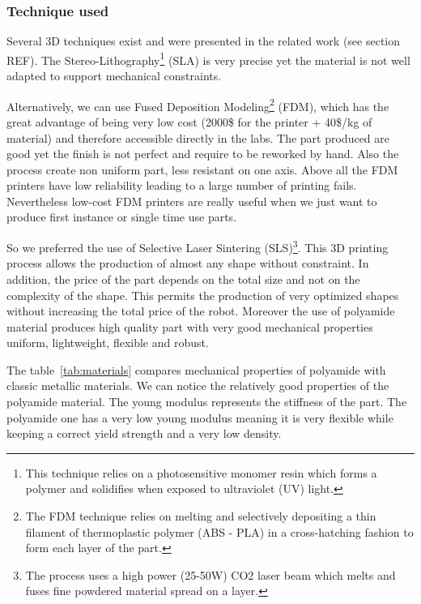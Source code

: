 \subsubsection{Technique used} %

Several 3D techniques exist and were presented in the related work (see section REF). The Stereo-Lithography\footnote{This technique relies on a photosensitive monomer resin which forms a polymer and solidifies when exposed to ultraviolet (UV) light.} (SLA) is very precise yet the material is not well adapted to support mechanical constraints.

Alternatively, we can use Fused Deposition Modeling\footnote{The FDM technique relies on melting and selectively depositing a thin filament of thermoplastic polymer (ABS - PLA) in a cross-hatching fashion to form each layer of the part.} (FDM), which has the great advantage of being very low cost (2000\$ for the printer + 40\$/kg of material) and therefore accessible directly in the labs. The part produced are good yet the finish is not perfect and require to be reworked by hand. Also the process create non uniform part, less resistant on one axis. Above all the FDM printers have low reliability leading to a large number of printing fails. Nevertheless low-cost FDM printers are really useful when we just want to produce first instance or single time use parts.

So we preferred the use of Selective Laser Sintering (SLS)\footnote{The process uses a high power (25-50W) CO2 laser beam which melts and fuses fine powdered material spread on a layer.}. This 3D printing process allows the production of almost any shape without constraint. In addition, the price of the part depends on the total size and not on the complexity of the shape. This permits the production of very optimized shapes without increasing the total price of the robot. Moreover the use of polyamide material produces high quality part with very good mechanical properties uniform, lightweight, flexible and robust.

The table~\ref{tab:materials} compares mechanical properties of polyamide with classic metallic materials. We can notice the relatively good properties of the polyamide material. The young modulus represents the stiffness of the part. The polyamide one has a very low young modulus meaning it is very flexible while keeping a correct yield strength and a very low density.

